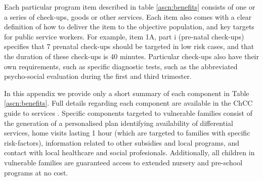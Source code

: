 \documentclass[12pt]{article}
\begin{document}
\begin{spacing}{1.4}
Each particular program item described in table \ref{ascn:benefits}
consists of one or a series of check-ups, goods or other
services.  Each item also comes with a clear definition of
how to deliver the item to the objective population, and key
targets for public service workers.  For example, item 1A, part
i (pre-natal check-ups) specifies that 7 prenatal check-ups
should be targeted in low risk cases, and that the duration of
these check-ups is 40 minutes.  Particular check-ups also have
their own requirements, such as specific diagnostic tests, such
as the abbreviated psycho-social evaluation during the first and
third trimester.

In this appendix we provide only a short summary of each
component in Table \ref{ascn:benefits}. Full details regarding
each component are available in the ChCC
guide to services \citep{MDS2014}.  Specific components
targeted to vulnerable families consist of the generation of
a personalised plan identifying availability of differential
services, home visits lasting 1 hour (which are 
targeted to families with specific risk-factors), information
related to other subsidies and local programs, and 
contact with local healthcare and social profesionals.  Additionally,
all children in vulnerable families are guaranteed access to
extended nursery and pre-school programs at no cost.



\end{spacing}
\end{document}
